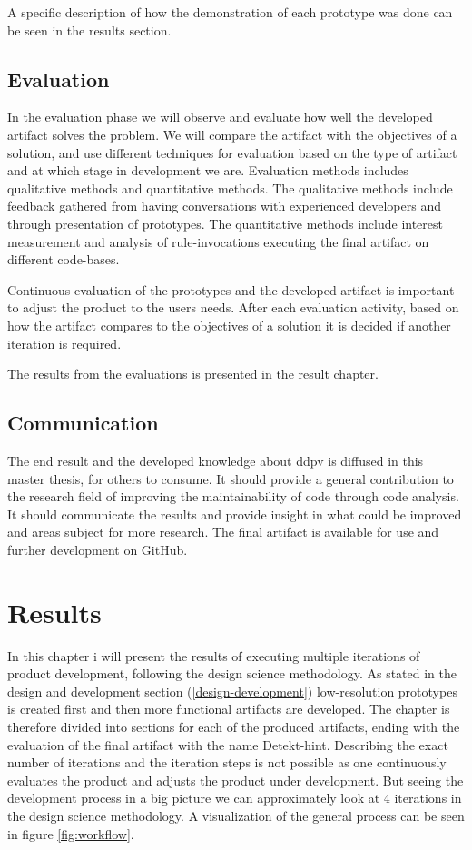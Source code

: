 \documentclass{report}
\begin{document}
A specific description of how the demonstration of each prototype was done can be seen in the results section.

 
\section{Evaluation}
In the evaluation phase we will observe and evaluate how well the developed artifact solves the problem. We will compare the artifact with the objectives of a solution, and use different techniques for evaluation based on the type of artifact and at which stage in development we are. Evaluation methods includes qualitative methods and quantitative methods. The qualitative methods include feedback gathered from having conversations with experienced developers and through presentation of prototypes. The quantitative methods include interest measurement and analysis of rule-invocations executing the final artifact on different code-bases.  

Continuous evaluation of the prototypes and the developed artifact is important to adjust the product to the users needs. After each evaluation activity, based on how the artifact compares to the objectives of a solution it is decided if another iteration is required.

The results from the evaluations is presented in the result chapter.

\section{Communication}
The end result and the developed knowledge about \gls{ddpv} is diffused in this master thesis, for others to consume. It should provide a general contribution to the research field of improving the maintainability of code through code analysis. It should communicate the results and provide insight in what could be improved and areas subject for more research. The final artifact is available for use and further development on GitHub\cite{detekt-hint-repository}.

\chapter{Results}
\label{results}

In this chapter i will present the results of executing multiple iterations of product development, following the design science methodology. As stated in the design and development section (\ref{design-development}) low-resolution 
prototypes is created first and then more functional artifacts are developed. The chapter is therefore divided into sections for each of the produced artifacts, ending with the evaluation of the final artifact with the name Detekt-hint. Describing the exact number of iterations and the iteration steps is not possible as one continuously evaluates the product and adjusts the product under development. But seeing the development process in a big picture we can approximately look at 4 iterations in the design science methodology. A visualization of the general process can be seen in figure \ref{fig:workflow}.
\end{document}
